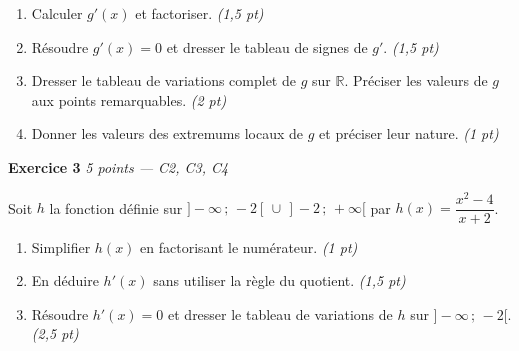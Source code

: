 \begin{enumerate}
  \item Calculer $g'(x)$ et factoriser. \hfill \textit{(1,5 pt)}
  \item Résoudre $g'(x) = 0$ et dresser le tableau de signes de $g'$. \hfill \textit{(1,5 pt)}
  \item Dresser le tableau de variations complet de $g$ sur $\mathbb{R}$. Préciser les valeurs de $g$ aux points remarquables. \hfill \textit{(2 pt)}
  \item Donner les valeurs des extremums locaux de $g$ et préciser leur nature. \hfill \textit{(1 pt)}
\end{enumerate}


\bigskip

\textbf{Exercice 3} \hfill \textit{5 points — C2, C3, C4}

Soit $h$ la fonction définie sur $]-\infty\,;\,-2[\,\cup\,]-2\,;\,+\infty[$ par $h(x) = \dfrac{x^2 - 4}{x + 2}$.

\begin{enumerate}
  \item Simplifier $h(x)$ en factorisant le numérateur. \hfill \textit{(1 pt)}
  \item En déduire $h'(x)$ sans utiliser la règle du quotient. \hfill \textit{(1,5 pt)}
  \item Résoudre $h'(x) = 0$ et dresser le tableau de variations de $h$ sur $]-\infty\,;\,-2[$. \hfill \textit{(2,5 pt)}
\end{enumerate}


